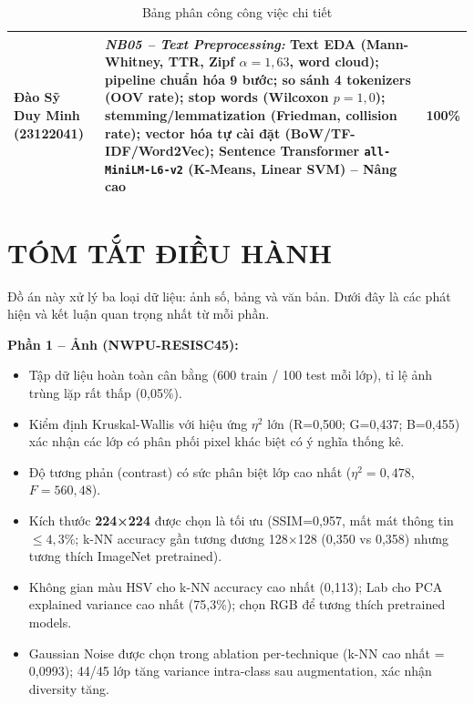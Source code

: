 \documentclass[12pt,a4paper]{article}
\let\oldtextbf\textbf
\renewcommand{\textbf}[1]{\oldtextbf{\textcolor{hcmublue}{#1}}}
\begin{document}
\begin{table}[H]
{\begin{tabular}{|l|p{13cm}|c|}
\textbf{Đào Sỹ Duy Minh} \newline (23122041) &
\textit{NB05 -- Text Preprocessing:} Text EDA (Mann-Whitney, TTR, Zipf $\alpha=1{,}63$, word cloud); pipeline chuẩn hóa 9 bước; so sánh 4 tokenizers (OOV rate); stop words (Wilcoxon $p=1{,}0$); stemming/lemmatization (Friedman, collision rate); vector hóa tự cài đặt (BoW/TF-IDF/Word2Vec); Sentence Transformer \texttt{all-MiniLM-L6-v2} (K-Means, Linear SVM) -- Nâng cao
& 100\% \\ \hline

\end{tabular}%
}
\caption{Bảng phân công công việc chi tiết}
\label{tab:work_distribution}
\end{table}

\section{TÓM TẮT ĐIỀU HÀNH}

Đồ án này xử lý ba loại dữ liệu: ảnh số, bảng và văn bản. Dưới đây là các phát hiện và kết luận quan trọng nhất từ mỗi phần.

\textbf{Phần 1 -- Ảnh (NWPU-RESISC45):}
\begin{itemize}
    \item Tập dữ liệu hoàn toàn cân bằng (600 train / 100 test mỗi lớp), tỉ lệ ảnh trùng lặp rất thấp (0,05\%).
    \item Kiểm định Kruskal-Wallis với hiệu ứng $\eta^2$ lớn (R=0,500; G=0,437; B=0,455) xác nhận các lớp có phân phối pixel khác biệt có ý nghĩa thống kê.
    \item Độ tương phản (contrast) có sức phân biệt lớp cao nhất ($\eta^2 = 0{,}478$, $F = 560{,}48$).
    \item Kích thước \textbf{224×224} được chọn là tối ưu (SSIM=0{,}957, mất mát thông tin $\leq 4{,}3\%$; k-NN accuracy gần tương đương 128×128 (0{,}350 vs 0{,}358) nhưng tương thích ImageNet pretrained).
    \item Không gian màu HSV cho k-NN accuracy cao nhất (0{,}113); Lab cho PCA explained variance cao nhất (75{,}3\%); chọn RGB để tương thích pretrained models.
    \item Gaussian Noise được chọn trong ablation per-technique (k-NN cao nhất = 0{,}0993); 44/45 lớp tăng variance intra-class sau augmentation, xác nhận diversity tăng.
\end{itemize}
\end{document}
